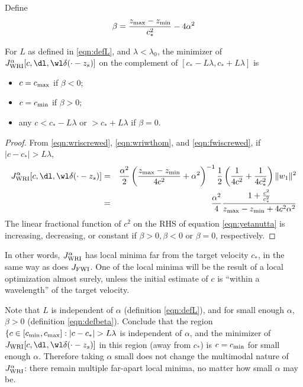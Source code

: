 Define
\begin{equation}
  \label{eqn:defbeta}
\beta = \frac{z_{\rm max}-z_{\rm min}}{c_*^2} - 4 \alpha^2
\end{equation}
\begin{theorem}
  \label{thm:thm2}
  For $L$ as defined in \ref{eqn:defL}, and $\lambda <
  \lambda_0$, the minimizer of $J_{\rm WRI}^{\alpha}[c,\dl,\wl \delta(\cdot-z_s)]$ on the
  complement of $[c_*-L\lambda, c_*+L\lambda]$ is
  \begin{itemize}
  \item $c=c_{\rm max}$ if $\beta<0$;
  \item $c=c_{\rm min}$ if $\beta>0$;
  \item any $c < c_*-L\lambda$ or $>c_*+L\lambda$ if $\beta=0$.
  \end{itemize}
\end{theorem}
\begin{proof}
  From \ref{eqn:wriscrewed}, \ref{eqn:wriwthom}, and
  \ref{eqn:fwiscrewed}, if $|c-c_*| > L\lambda$,
\begin{eqnarray}
    J_{\rm WRI}^{\alpha}[c,\dl,\wl\delta(\cdot-z_s)] &=&
    \frac{\alpha^2}{2}\left(\frac{z_{\rm max}-z_{\rm
          min}}{4c^2}+\alpha^2\right)^{-1}\frac{1}{2}\left(\frac{1}{4c^2}+\frac{1}{4c_*^2}\right)\|w_1\|^2\nonumber\\
   & =&    \frac{\alpha^2}{4}\frac{1+\frac{c^2}{c_*^2}}{z_{\rm 
        max}-z_{\rm min}+4c^2\alpha^2}
  \label{eqn:yetanutta}
\end{eqnarray}
  The linear fractional function of $c^2$ on the RHS of equation
  \ref{eqn:yetanutta} is increasing, decreasing,
  or constant if $\beta>0, \beta<0$ or $\beta=0$, respectively.
\end{proof}

In other words, $J_{\rm WRI}^{\alpha}$ has local minima far from the target
velocity $c_*$, in the same way as does $J_{\rm FWI}$. One of the
local minima will be the result of a local optimization almost surely,
unless the initial estimate of $c$ is ``within a wavelength'' of the
target velocity.

Note that $L$ is independent of $\alpha$ (definition \ref{eqn:defL}),
and for small enough $\alpha$, $\beta > 0$ (definition
\ref{eqn:defbeta}). Conclude that the region $\{c \in [c_{\rm min},
c_{\rm max}]: |c-c_*| > L\lambda$ is
independent of $\alpha$, and the minimizer of
$J_{\rm WRI}[c,\dl,\wl\delta(\cdot-z_s)]$ in this region (away from
$c_*$) is $c=c_{\rm min}$ for small enough $\alpha$. Therefore taking
$\alpha$ small does not change the multimodal nature of
$J_{\rm WRI}^{\alpha}$: there remain multiple far-apart local minima,
no matter how small $\alpha$ may be.

